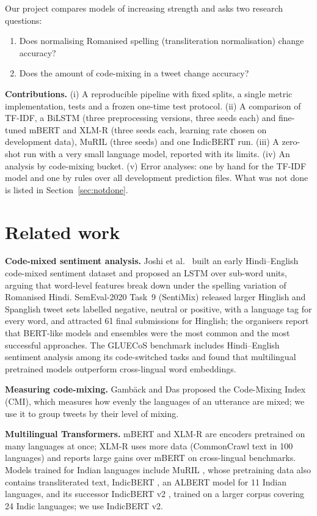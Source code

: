 Our project compares models of increasing strength and asks two research questions:
\begin{enumerate}
\item Does normalising Romanised spelling (transliteration normalisation) change accuracy?
\item Does the amount of code-mixing in a tweet change accuracy?
\end{enumerate}
\textbf{Contributions.} (i) A reproducible pipeline with fixed splits, a single metric implementation, tests and a
frozen one-time test protocol. (ii) A comparison of TF-IDF, a BiLSTM (three preprocessing versions, three seeds each) and
fine-tuned mBERT and XLM-R (three seeds each, learning rate chosen on development data), MuRIL (three seeds) and one
IndicBERT run. (iii) A zero-shot run with a very
small language model, reported with its limits. (iv) An analysis by code-mixing bucket. (v) Error analyses: one by hand
for the TF-IDF model and one by rules over all development prediction files. What was not done is listed in Section~\ref{sec:notdone}.

\section{Related work}
\textbf{Code-mixed sentiment analysis.} Joshi et al.\ \cite{joshi2016} built an early Hindi--English code-mixed
sentiment dataset and proposed an LSTM over sub-word units, arguing that word-level features break down under the spelling
variation of Romanised Hindi. SemEval-2020 Task~9 (SentiMix) \cite{patwa2020} released larger Hinglish and Spanglish
tweet sets labelled negative, neutral or positive, with a language tag for every word, and attracted 61 final submissions
for Hinglish; the organisers report that BERT-like models and ensembles were the most common and the most successful
approaches. The GLUECoS benchmark \cite{khanuja2020gluecos} includes Hindi--English sentiment analysis among its
code-switched tasks and found that multilingual pretrained models outperform cross-lingual word embeddings.

\textbf{Measuring code-mixing.} Gamb\"ack and Das \cite{gamback2014} proposed the Code-Mixing Index (CMI), which measures
how evenly the languages of an utterance are mixed; we use it to group tweets by their level of mixing.

\textbf{Multilingual Transformers.} mBERT \cite{devlin2019} and XLM-R \cite{conneau2020} are encoders pretrained on many
languages at once; XLM-R uses more data (CommonCrawl text in 100 languages) and reports large gains over mBERT on
cross-lingual benchmarks. Models trained for Indian languages include MuRIL \cite{khanuja2021}, whose pretraining data
also contains transliterated text, IndicBERT \cite{kakwani2020}, an ALBERT model for 11 Indian languages, and its successor
IndicBERT v2 \cite{doddapaneni2023}, trained on a larger corpus covering 24 Indic languages; we use IndicBERT v2.

